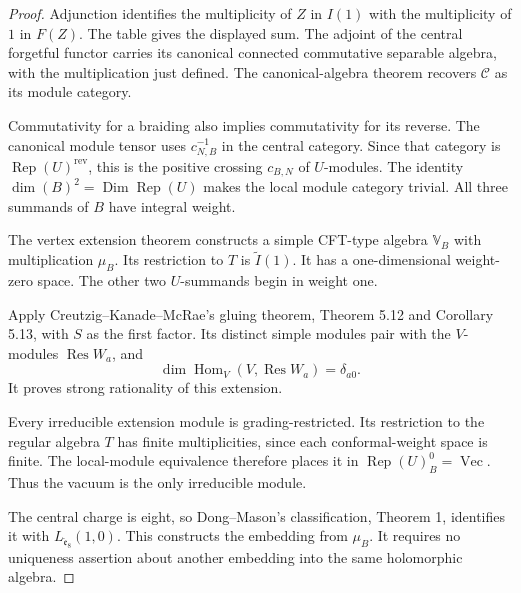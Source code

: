 \begin{proof}
Adjunction identifies the multiplicity of $Z$ in $I(1)$
with the multiplicity of $1$ in $F(Z)$.
The table gives the displayed sum.
The adjoint of the central forgetful functor carries
its canonical connected commutative separable algebra,
with the multiplication just defined.
The canonical-algebra theorem recovers $\mathcal C$
as its module category.

Commutativity for a braiding also implies commutativity
for its reverse. The canonical module tensor uses
$c_{N,B}^{-1}$ in the central category.
Since that category is $\operatorname{Rep}(U)^{\mathrm{rev}}$,
this is the positive crossing $c_{B,N}$ of $U$-modules.
The identity
$\dim(B)^2=\operatorname{Dim}\operatorname{Rep}(U)$
makes the local module category trivial.
All three summands of $B$ have integral weight.

The vertex extension theorem constructs a simple CFT-type
algebra $\mathbb V_B$ with multiplication $\mu_B$.
Its restriction to $T$ is $\widetilde I(1)$.
It has a one-dimensional weight-zero space. The other
two $U$-summands begin in weight one.

Apply Creutzig--Kanade--McRae's gluing theorem,
Theorem 5.12 and Corollary 5.13, with $S$ as the first factor.
Its distinct simple modules pair with the $V$-modules
$\operatorname{Res}W_a$, and
\[
 \dim\operatorname{Hom}_V(V,\operatorname{Res}W_a)=\delta_{a0}.
\]
It proves strong rationality of this extension.

Every irreducible extension module is grading-restricted.
Its restriction to the regular algebra $T$ has finite
multiplicities, since each conformal-weight space is finite.
The local-module equivalence therefore places it in
$\operatorname{Rep}(U)_B^0=\operatorname{Vec}$.
Thus the vacuum is the only irreducible module.

The central charge is eight, so Dong--Mason's
classification, Theorem 1, identifies it with
$L_{\widehat{\mathfrak e}_8}(1,0)$.
This constructs the embedding from $\mu_B$.
It requires no uniqueness assertion about another
embedding into the same holomorphic algebra.
\end{proof}

